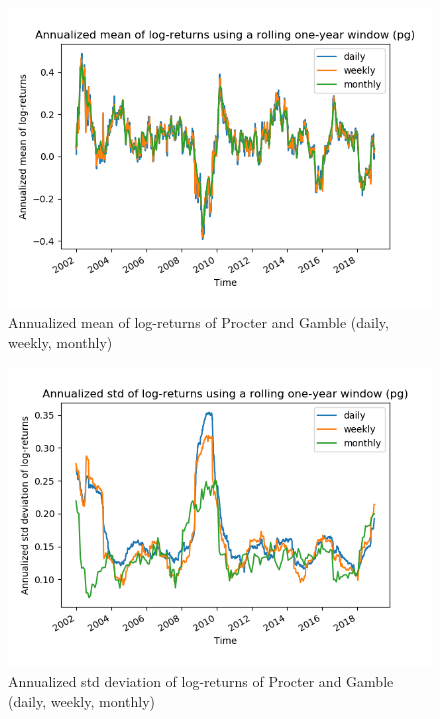 \documentclass[10pt]{article}
\newenvironment{exercise}[2][Exercise]{\begin{trivlist}
  \item[\hskip \labelsep {\bfseries #1}\hskip \labelsep {\bfseries #2.}]}{\end{trivlist}}
\begin{document}
\begin{exercise}{4}
\begin{figure}[H]
		\centering
		\includegraphics[scale=0.5]{Figures/problem4d_mean_pg.png}	
		\caption{Annualized mean of log-returns of Procter and Gamble (daily, weekly, monthly)}	
		\label{fig:problem3d_mean_pg}
	
	\end{figure}
	
	\begin{figure}[H]
	
		\centering
		\includegraphics[scale=0.5]{Figures/problem4d_std_pg.png}	
		\caption{Annualized std deviation of log-returns of Procter and Gamble (daily, weekly, monthly)}	
		\label{fig:problem3d_std_pg}
	
	\end{figure}	  
 
	\bigbreak	
		

\end{exercise}
\end{document}

